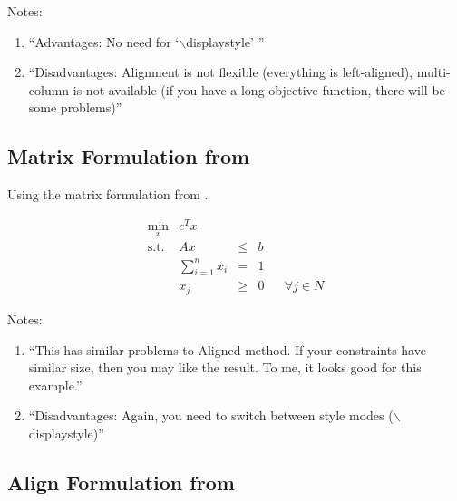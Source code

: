 \documentclass[letter,12pt]{article}
\begin{document}
Notes: \vspace{-0.3cm}
\begin{enumerate} \itemsep -4pt
\item ``Advantages: No need for `$\backslash$displaystyle' ''
\item ``Disadvantages: Alignment is not flexible (everything is left-aligned), multi-column is not available (if you have a long objective function, there will be some problems)''
\end{enumerate}





\subsection{Matrix Formulation from \cite{Cay2013}}
\label{ssec:MatrixFormulationFromCay2013}

Using the matrix formulation from \cite{Cay2013}.



\begin{equation}
\begin{matrix}
\displaystyle \min_x & c^T x  \\
\textrm{s.t.} & A x & \leq & b  \\
& \displaystyle \sum_{i=1}^{n} x_i & = & 1  \\
& x_j & \geq & 0 & & \forall j \in N
\end{matrix}
\end{equation}


Notes: \vspace{-0.3cm}
\begin{enumerate} \itemsep -4pt
\item ``This has similar problems to Aligned method. If your constraints have similar size, then you may like the result. To me, it looks good for this example.''
\item ``Disadvantages: Again, you need to switch between style modes ($\backslash$displaystyle)''
\end{enumerate}





\subsection{Align Formulation from \cite{Cay2013}}
\label{ssec:AlignFormulationFromCay2013}
\end{document}
